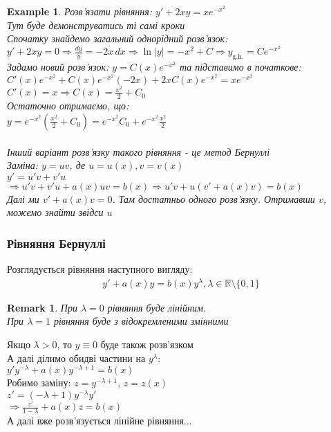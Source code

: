 \documentclass[a4paper, 10pt]{article}
\theoremstyle{theoremdd}
\theoremstyle{theoremdd}
\theoremstyle{theoremdd}
\theoremstyle{theoremdd}
\newtheorem{example}[theorem]{Example}
\theoremstyle{theoremdd}
\theoremstyle{theoremdd}
\newtheorem{remark}[theorem]{Remark}
\theoremstyle{theoremdd}
\theoremstyle{theoremdd}
\begin{document}
	\begin{example}
 Розв'язати рівняння: $\displaystyle y' + 2xy = xe^{-x^2}$\\
	Тут буде демонструватись ті самі кроки\\
	Спочатку знайдемо загальний однорідний розв'язок:\\
	$y'+2xy=0 \Rightarrow \displaystyle \frac{dy}{y} = -2x \,dx \Rightarrow \ln |y| = -x^2 + C \Rightarrow y_{\textrm{g.h.}} = Ce^{-x^2}$\\
	Задамо новий розв'язок: $y = C(x)e^{-x^2}$ та підставимо в початкове:\\
	$C'(x)e^{-x^2} + C(x)e^{-x^2}(-2x) + 2xC(x)e^{-x^2} = xe^{-x^2}$\\
	$C'(x) = x \Rightarrow \displaystyle C(x) = \frac{x^2}{2} + C_0$\\
	Остаточно отримаємо, що:\\
	$\displaystyle y = e^{-x^2} \left(\frac{x^2}{2} + C_0 \right) = e^{-x^2}C_0 + e^{-x^2} \frac{x^2}{2}$\\
	\bigskip \\
	Інший варіант розв'язку такого рівняння - це метод Бернуллі\\
	Заміна: $y = uv$, де $u=u(x), v=v(x)$\\
	$y' = u'v+v'u$\\
	$\Rightarrow u'v + v'u + a(x)uv = b(x) \Rightarrow u'v + u(v'+a(x)v)=b(x)$\\
	Далі ми $v'+a(x)v = 0$. Там достатньо одного розв'язку. Отримавши $v$, можемо знайти звідси $u$
	\end{example}

	
	\subsubsection{Рівняння Бернуллі}
	Розглядується рівняння наступного вигляду:
	\begin{align*}
	y' + a(x)y = b(x)y^{\lambda}, \lambda \in \mathbb{R} \setminus \{0,1\}
	\end{align*}
	\begin{remark}
 При $\lambda = 0$ рівняння буде лінійним.\\
	При $\lambda = 1$ рівняння буде з відокремленими змінними
	\end{remark}
	
	Якщо $\lambda > 0$, то $y \equiv 0$ буде також розв'язком\\
	
	
	А далі ділимо обидві частини на $y^{\lambda}$:\\
	$\displaystyle y'y^{-\lambda} + a(x)y^{-\lambda+1} = b(x)$\\
	Робимо заміну: $z = y^{-\lambda+1}$, $z=z(x)$\\
	$z' = (-\lambda + 1)y^{-\lambda}y'$\\
	$\Rightarrow \displaystyle \frac{z'}{1-\lambda} + a(x)z=b(x)$\\
	А далі вже розв'язується лінійне рівняння...
	
\end{document}
